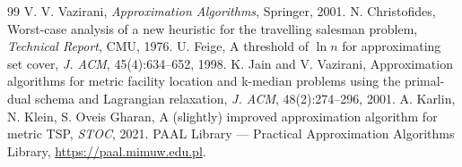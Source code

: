 \documentclass[11pt,oneside]{book}
\begin{document}
\backmatter

\begin{thebibliography}{99}
 V. V. Vazirani, \textit{Approximation Algorithms}, Springer, 2001.
 N. Christofides, Worst-case analysis of a new heuristic for the travelling salesman problem, \textit{Technical Report}, CMU, 1976.
 U. Feige, A threshold of $\ln n$ for approximating set cover, \textit{J. ACM}, 45(4):634--652, 1998.
 K. Jain and V. Vazirani, Approximation algorithms for metric facility location and k-median problems using the primal-dual schema and Lagrangian relaxation, \textit{J. ACM}, 48(2):274--296, 2001.
 A. Karlin, N. Klein, S. Oveis Gharan, A (slightly) improved approximation algorithm for metric TSP, \textit{STOC}, 2021.
 PAAL Library — Practical Approximation Algorithms Library, \url{https://paal.mimuw.edu.pl}.
\end{thebibliography}

\end{document}
